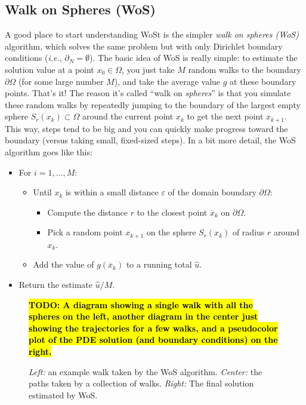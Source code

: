 \documentclass{article}
\newcommand{\todo}[1]{\textbf{\hl{TODO: #1}}}
\newcommand{\ie}{\emph{i.e.}} %
\renewcommand{\vec}[1]{#1}
\begin{document}
\subsection{Walk on Spheres (WoS)}
\label{sec:WalkOnSpheresOverview}

A good place to start understanding WoSt is the simpler \emph{walk on spheres (WoS)} algorithm, which solves the same problem but with only Dirichlet boundary conditions (\ie, \(\partial_N = \emptyset\)).  The basic idea of WoS is really simple: to estimate the solution value at a point \(\vec{x}_0 \in \Omega\), you just take \(M\) random walks to the boundary \(\partial\Omega\) (for some large number \(M\)), and take the average value \(g\) at these boundary points.  That's it!  The reason it's called ``walk on \emph{spheres}'' is that you simulate these random walks by repeatedly jumping to the boundary of the largest empty sphere \(S_r(\vec{x}_k) \subset \Omega\) around the current point \(\vec{x}_k\) to get the next point \(\vec{x}_{k+1}\).  This way, steps tend to be big and you can quickly make progress toward the boundary (versus taking small, fixed-sized steps).  In a bit more detail, the WoS algorithm goes like this:

\begin{itemize}
   \item For \(i = 1, \ldots, M\):
\begin{itemize}
   \item Until \(\vec{x}_k\) is within a small distance \(\varepsilon\) of the domain boundary \(\partial\Omega\):
      \begin{itemize}
         \item Compute the distance \(r\) to the closest point \(\overline{\vec{x}}_k\) on \(\partial\Omega\).
         \item Pick a random point \(\vec{x}_{k+1}\) on the sphere \(S_r(\vec{x}_k)\) of radius \(r\) around \(\vec{x}_k\).
      \end{itemize}
   \item Add the value of \(g(\overline{\vec{x}}_k)\) to a running total \(\widehat{u}\).
\end{itemize}
   \item Return the estimate \(\widehat{u}/M\).
\end{itemize}

\begin{figure}[h!]
   \todo{A diagram showing a single walk with all the spheres on the left, another diagram in the center just showing the trajectories for a few walks, and a pseudocolor plot of the PDE solution (and boundary conditions) on the right.}
   \caption{\emph{Left:} an example walk taken by the WoS algorithm. \emph{Center:} the paths taken by a collection of walks. \emph{Right:} The final solution estimated by WoS.\label{fig:WoSExample}}
\end{figure}
\end{document}
